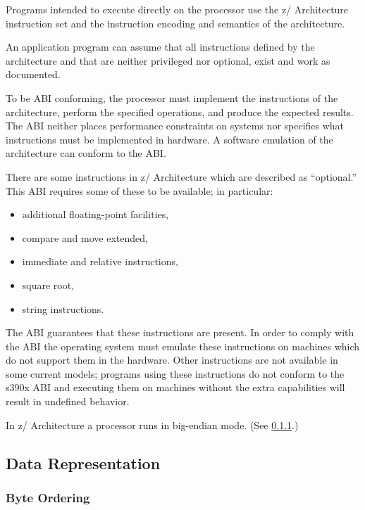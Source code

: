 \documentclass[USenglish,fontsize=11pt,twoside,%
  toc=bib,toc=idx,toc=graduated,numbers=noendperiod,
  bookmarks=true,
  bookmarksnumbered=true,
  bookmarksopen=true,
  bookmarksopenlevel=1,
  breaklinks=true,
  colorlinks=true,
  linkcolor=black,
  pdfpagelayout={TwoPageRight},
  pdfusetitle=true
]{scrreprt}
\newcommand{\ABINAME}{s390x}
\newcommand{\ARCH}{z/\kern-1pt Ar\-chi\-tec\-ture}
\newcommand{\ARCHarch}{\ARCH}
\newcommand{\ABINAME}{s390}
\newcommand{\ARCH}{ESA/390}
\newcommand{\ARCHarch}{the \ARCH{} ar\-chi\-tec\-ture}
\begin{document}

Programs intended to execute directly on the processor use the
\ARCH{} instruction set and the
instruction encoding and semantics of the architecture.

An application program can assume that all instructions defined by the
architecture and that are neither privileged nor optional, exist and work
as documented.

To be ABI conforming, the processor must implement the instructions of
the architecture, perform the specified operations, and produce the
expected results.  The ABI neither places performance constraints on
systems nor specifies what instructions must be implemented in
hardware.  A software emulation of the architecture can conform to
the ABI\@.

{\ifzseries\else
  There are some instructions in \ARCHarch{}
  which are described as ``optional.''  This ABI
  requires some of these to be available; in particular:
  \begin{itemize}
  \item additional floating-point facilities, %
  \item compare and move extended,
  \item immediate and relative instructions,
  \item square root,
  \item string instructions.
  \end{itemize}

  The ABI guarantees that these instructions are present.  In order to
  comply with the ABI the operating system must emulate these
  instructions on machines which do not support them in the hardware.
  Other instructions are not available in some current models; programs
  using these instructions do not conform to the \ABINAME{} ABI and
  executing them on machines without the extra capabilities will result
  in undefined behavior.  \fi}

In \ARCHarch{} a
processor runs in big-endian mode.  (See \cref{byteordering}.)

\subsection{Data Representation}
\subsubsection{Byte Ordering}
\label{byteordering}
\end{document}
